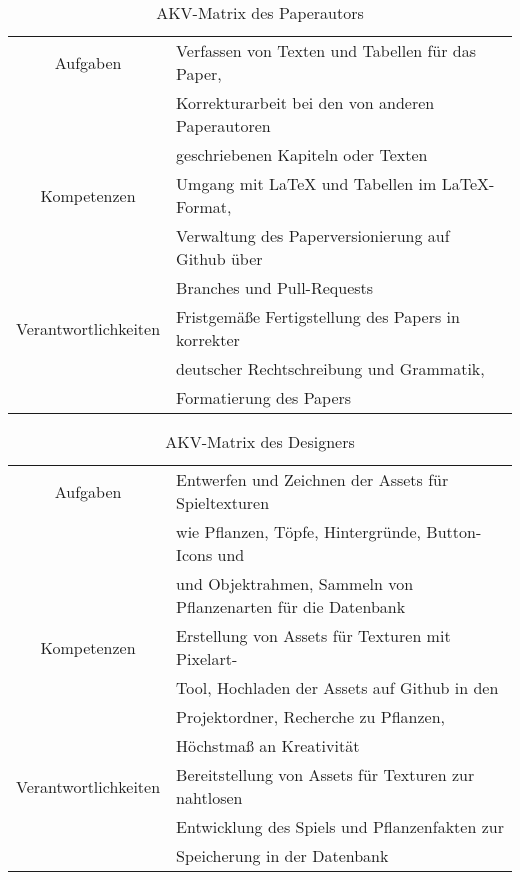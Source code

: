 \begin{table}[H]
    \begin{center}
        \label{tab:paperautor}
        \begin{tabular}{c|p{9cm}}
            Aufgaben & Verfassen von Texten und Tabellen für das Paper, \\
            & Korrekturarbeit bei den von anderen Paperautoren \\
            & geschriebenen Kapiteln oder Texten \\
            \hline
            Kompetenzen & Umgang mit LaTeX und Tabellen im LaTeX-Format, \\
            & Verwaltung des Paperversionierung auf Github über \\
            & Branches und Pull-Requests \\
            \hline
            Verantwortlichkeiten & Fristgemäße Fertigstellung des Papers in korrekter \\
            & deutscher Rechtschreibung und Grammatik, \\
            & Formatierung des Papers \\
        \end{tabular}
        \caption{AKV-Matrix des Paperautors}
    \end{center}
\end{table}
\begin{table}[H]
    \begin{center}
        \label{tab:designer}
        \begin{tabular}{c|p{9cm}}
            Aufgaben & Entwerfen und Zeichnen der Assets für Spieltexturen \\
            & wie Pflanzen, Töpfe, Hintergründe, Button-Icons und \\
            & und Objektrahmen, Sammeln von Pflanzenarten für die Datenbank \\
            \hline
            Kompetenzen & Erstellung von Assets für Texturen mit Pixelart- \\
            & Tool, Hochladen der Assets auf Github in den \\
            & Projektordner, Recherche zu Pflanzen, \\
            & Höchstmaß an Kreativität \\
            \hline
            Verantwortlichkeiten & Bereitstellung von Assets für Texturen zur nahtlosen \\
            & Entwicklung des Spiels und Pflanzenfakten zur \\
            & Speicherung in der Datenbank \\
        \end{tabular}
        \caption{AKV-Matrix des Designers}
    \end{center}
\end{table}

